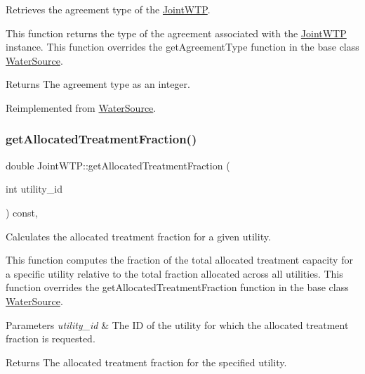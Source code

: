 Retrieves the agreement type of the \mbox{\hyperlink{classJointWTP}{Joint\+W\+TP}}. 

This function returns the type of the agreement associated with the {\ttfamily \mbox{\hyperlink{classJointWTP}{Joint\+W\+TP}}} instance. This function overrides the {\ttfamily get\+Agreement\+Type} function in the base class {\ttfamily \mbox{\hyperlink{classWaterSource}{Water\+Source}}}.

\begin{DoxyReturn}{Returns}
The agreement type as an integer. 
\end{DoxyReturn}


Reimplemented from \mbox{\hyperlink{classWaterSource_add1082429d114b41cb9e3afaa623aeb1}{Water\+Source}}.

\mbox{\label{classJointWTP_a3c661704dec4c92b8c16f28e39ca533e}} 
\subsubsection{\texorpdfstring{get\+Allocated\+Treatment\+Fraction()}{getAllocatedTreatmentFraction()}}
{\footnotesize\ttfamily double Joint\+W\+T\+P\+::get\+Allocated\+Treatment\+Fraction (\begin{DoxyParamCaption}\item[{int}]{utility\+\_\+id }\end{DoxyParamCaption}) const\hspace{0.3cm}{\ttfamily [override]}, {\ttfamily [virtual]}}



Calculates the allocated treatment fraction for a given utility. 

This function computes the fraction of the total allocated treatment capacity for a specific utility relative to the total fraction allocated across all utilities. This function overrides the {\ttfamily get\+Allocated\+Treatment\+Fraction} function in the base class {\ttfamily \mbox{\hyperlink{classWaterSource}{Water\+Source}}}.


\begin{DoxyParams}{Parameters}
{\em utility\+\_\+id} & The ID of the utility for which the allocated treatment fraction is requested. \\
\hline
\end{DoxyParams}
\begin{DoxyReturn}{Returns}
The allocated treatment fraction for the specified utility. 
\end{DoxyReturn}


